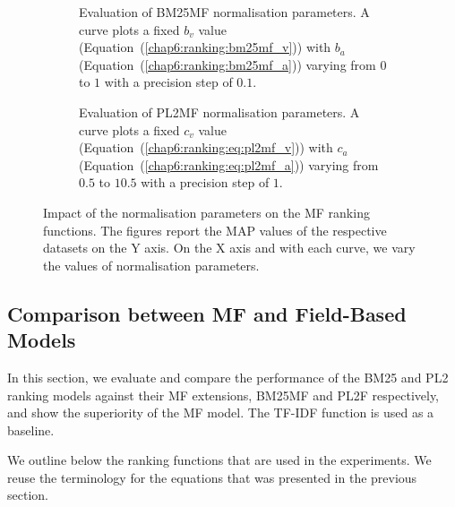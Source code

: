 \begin{figure}
	\centering
	\begin{subfigure}{\textwidth}
		\centering
		
		\addtocounter{subfigure}{-1}
		\caption{Evaluation of BM25MF normalisation parameters. A curve plots a fixed $b_v$ value (Equation~(\ref{chap6:ranking:bm25mf_v})) with $b_a$ (Equation~(\ref{chap6:ranking:bm25mf_a})) varying from $0$ to $1$ with a precision step of $0.1$.}
		\label{chap6:ranking:fig:bm25mf-norm}
	\end{subfigure}
	\qquad
	\begin{subfigure}{\textwidth}
		\centering
		
		\addtocounter{subfigure}{-1}
		\caption{Evaluation of PL2MF normalisation parameters. A curve plots a fixed $c_v$ value (Equation~(\ref{chap6:ranking:eq:pl2mf_v})) with $c_a$ (Equation~(\ref{chap6:ranking:eq:pl2mf_a})) varying from $0.5$ to $10.5$ with a precision step of $1$.}
		\label{fig:pl2mf-norm}
	\end{subfigure}
	\caption[Impact of the normalisation parameters on the MF ranking functions]{Impact of the normalisation parameters on the \gls{MF} ranking functions. The figures report the MAP values of the respective datasets on the Y axis. On the X axis and with each curve, we vary the values of normalisation parameters.}
\end{figure}

\subsection{Comparison between MF and Field-Based Models}
\label{sec:mf-field-cmp}

In this section, we evaluate and compare the performance of the BM25 and PL2 ranking models against their \gls{MF} extensions, \gls{BM25MF} and PL2F respectively, and show the superiority of the \gls{MF} model. The TF-IDF function is used as a baseline.

We outline below the ranking functions that are used in the experiments. We reuse the terminology for the equations that was presented in the previous section.

